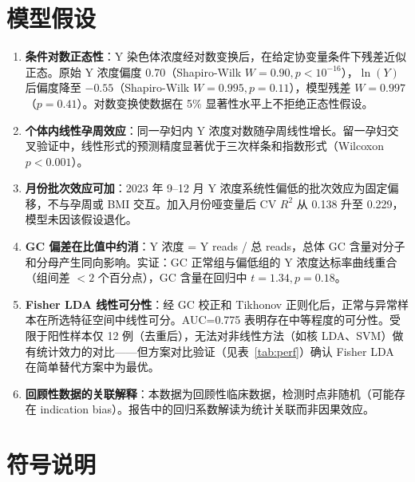 \documentclass{mcm-paper}
\begin{document}
\newpage

\section{模型假设}

\begin{enumerate}
    \item \textbf{条件对数正态性}：Y 染色体浓度经对数变换后，在给定协变量条件下残差近似正态。原始 Y 浓度偏度 0.70（Shapiro-Wilk $W=0.90, p<10^{-16}$），$\ln(Y)$ 后偏度降至 $-0.55$（Shapiro-Wilk $W=0.995, p=0.11$），模型残差 $W=0.997$（$p=0.41$）。对数变换使数据在 5\% 显著性水平上不拒绝正态性假设。
    \item \textbf{个体内线性孕周效应}：同一孕妇内 Y 浓度对数随孕周线性增长。留一孕妇交叉验证中，线性形式的预测精度显著优于三次样条和指数形式（Wilcoxon $p<0.001$）。
    \item \textbf{月份批次效应可加}：2023 年 9--12 月 Y 浓度系统性偏低的批次效应为固定偏移，不与孕周或 BMI 交互。加入月份哑变量后 CV $R^2$ 从 0.138 升至 0.229，模型未因该假设退化。
    \item \textbf{GC 偏差在比值中约消}：Y 浓度 = Y reads / 总 reads，总体 GC 含量对分子和分母产生同向影响。实证：GC 正常组与偏低组的 Y 浓度达标率曲线重合（组间差 $<2$ 个百分点），GC 含量在回归中 $t=1.34, p=0.18$。
    \item \textbf{Fisher LDA 线性可分性}：经 GC 校正和 Tikhonov 正则化后，正常与异常样本在所选特征空间中线性可分。AUC=0.775 表明存在中等程度的可分性。受限于阳性样本仅 12 例（去重后），无法对非线性方法（如核 LDA、SVM）做有统计效力的对比——但方案对比验证（见表~\ref{tab:perf}）确认 Fisher LDA 在简单替代方案中为最优。
    \item \textbf{回顾性数据的关联解释}：本数据为回顾性临床数据，检测时点非随机（可能存在 indication bias）。报告中的回归系数解读为统计关联而非因果效应。
\end{enumerate}

\section{符号说明}
\end{document}

